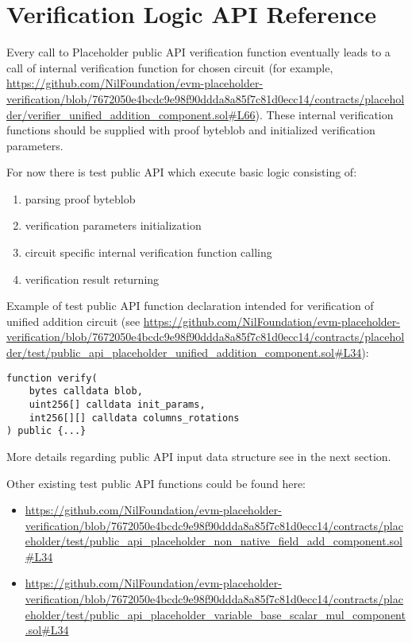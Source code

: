 \section{Verification Logic API Reference}

Every call to Placeholder public API verification function eventually leads to a call of internal verification function for chosen circuit
    (for example, \url{https://github.com/NilFoundation/evm-placeholder-verification/blob/7672050e4bcdc9e98f90ddda8a85f7c81d0ecc14/contracts/placeholder/verifier_unified_addition_component.sol#L66}). 
These internal verification functions should be supplied with proof byteblob and initialized verification parameters.

For now there is test public API which execute basic logic consisting of:
\begin{enumerate}
    \item parsing proof byteblob
    \item verification parameters initialization
    \item circuit specific internal verification function calling
    \item verification result returning
\end{enumerate}

Example of test public API function declaration intended for verification of unified addition circuit
 (see \url{https://github.com/NilFoundation/evm-placeholder-verification/blob/7672050e4bcdc9e98f90ddda8a85f7c81d0ecc14/contracts/placeholder/test/public_api_placeholder_unified_addition_component.sol#L34}):

\begin{verbatim}
function verify(
    bytes calldata blob,
    uint256[] calldata init_params,
    int256[][] calldata columns_rotations
) public {...}
\end{verbatim}

More details regarding public API input data structure see in the next section.

Other existing test public API functions could be found here:
\begin{itemize}
    \item \url{https://github.com/NilFoundation/evm-placeholder-verification/blob/7672050e4bcdc9e98f90ddda8a85f7c81d0ecc14/contracts/placeholder/test/public_api_placeholder_non_native_field_add_component.sol#L34}
    \item \url{https://github.com/NilFoundation/evm-placeholder-verification/blob/7672050e4bcdc9e98f90ddda8a85f7c81d0ecc14/contracts/placeholder/test/public_api_placeholder_variable_base_scalar_mul_component.sol#L34}
\end{itemize}

